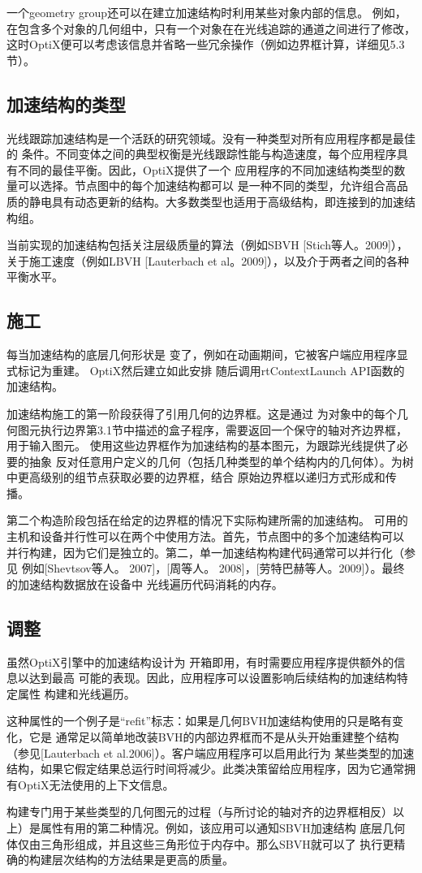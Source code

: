 一个geometry group还可以在建立加速结构时利用某些对象内部的信息。
例如，在包含多个对象的几何组中，只有一个对象在在光线追踪的通道之间进行了修改， 
这时OptiX便可以考虑该信息并省略一些冗余操作（例如边界框计算，详细见5.3节）。

\subsection{加速结构的类型}

光线跟踪加速结构是一个活跃的研究领域。没有一种类型对所有应用程序都是最佳的
条件。不同变体之间的典型权衡是光线跟踪性能与构造速度，每个应用程序具有不同的最佳平衡。因此，OptiX提供了一个
应用程序的不同加速结构类型的数量可以选择。节点图中的每个加速结构都可以
是一种不同的类型，允许组合高品质的静电具有动态更新的结构。大多数类型也适用于高级结构，即连接到的加速结构组。

当前实现的加速结构包括关注层级质量的算法（例如SBVH [Stich等人。2009]），
关于施工速度（例如LBVH [Lauterbach et al。2009]），以及介于两者之间的各种平衡水平。

\subsection{施工}

每当加速结构的底层几何形状是
变了，例如在动画期间，它被客户端应用程序显式标记为重建。 OptiX然后建立如此安排
随后调用rtContextLaunch API函数的加速结构。

加速结构施工的第一阶段获得了引用几何的边界框。这是通过
为对象中的每个几何图元执行边界第3.1节中描述的盒子程序，需要返回一个保守的轴对齐边界框，用于输入图元。
使用这些边界框作为加速结构的基本图元，为跟踪光线提供了必要的抽象
反对任意用户定义的几何（包括几种类型的单个结构内的几何体）。为树中更高级别的组节点获取必要的边界框，结合
原始边界框以递归方式形成和传播。

第二个构造阶段包括在给定的边界框的情况下实际构建所需的加速结构。
可用的主机和设备并行性可以在两个中使用方法。首先，节点图中的多个加速结构可以
并行构建，因为它们是独立的。第二，单一加速结构构建代码通常可以并行化（参见
例如[Shevtsov等人。 2007]，[周等人。 2008]，[劳特巴赫等人。2009]）。最终的加速结构数据放在设备中
光线遍历代码消耗的内存。

\subsection{调整}

虽然OptiX引擎中的加速结构设计为
开箱即用，有时需要应用程序提供额外的信息以达到最高
可能的表现。因此，应用程序可以设置影响后续结构的加速结构特定属性
构建和光线遍历。

这种属性的一个例子是“refit”标志：如果是几何BVH加速结构使用的只是略有变化，它是
通常足以简单地改装BVH的内部边界框而不是从头开始重建整个结构（参见[Lauterbach et al.2006]）。客户端应用程序可以启用此行为
某些类型的加速结构，如果它假定结果总运行时间将减少。此类决策留给应用程序，因为它通常拥有OptiX无法使用的上下文信息。

构建专门用于某些类型的几何图元的过程（与所讨论的轴对齐的边界框相反）以上）是属性有用的第二种情况。例如，该应用可以通知SBVH加速结构
底层几何体仅由三角形组成，并且这些三角形位于内存中。那么SBVH就可以了
执行更精确的构建层次结构的方法结果是更高的质量。